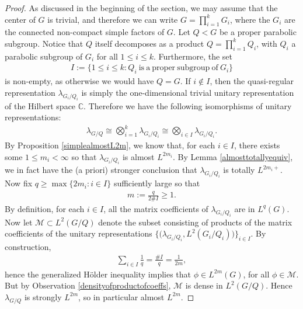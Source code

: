 \documentclass[psamsfonts]{amsart}
\theoremstyle{definition}
\theoremstyle{remark}
\numberwithin{equation}{section}
\begin{document}
\begin{proof}
As discussed in the beginning of the section, we may assume that the center of $G$ is trivial, and therefore we can write $G = \prod_{i=1}^{k} G_{i}$, where the $G_{i}$ are the connected non-compact simple factors of $G$. Let $Q < G$ be a proper parabolic subgroup. Notice that $Q$ itself decomposes as a product $Q = \prod_{i=1}^{k} Q_{i}$, with $Q_{i}$ a parabolic subgroup of $G_{i}$ for all $1 \leq i \leq k$. Furthermore, the set
\begin{align*}
I := \{1 \leq i \leq k : Q_{i} \ \mathrm{is \ a \ proper \ subgroup \ of} \ G_{i} \}
\end{align*} is non-empty, as otherwise we would have $Q = G$. If $i \notin I$, then the quasi-regular representation $\lambda_{G_{i} / Q_{i}}$ is simply the one-dimensional trivial unitary representation of the Hilbert space $\mathbb{C}$. Therefore we have the following isomorphisms of unitary representations:
\begin{align*}
\lambda_{G/Q} \cong \bigotimes_{i=1}^{k} \lambda_{G_{i}/Q_{i}} \cong \bigotimes_{i \in I} \lambda_{G_{i}/Q_{i}}.
\end{align*}
By Proposition \ref{simplealmostL2m}, we know that, for each $i \in I$, there exists some $1 \leq m_{i} < \infty$ so that $\lambda_{G_{i}/Q_{i}}$ is almost $L^{2m_{i}}$. By Lemma \ref{almosttotallyequiv}, we in fact have the (a priori) stronger conclusion that $\lambda_{G_{i}/Q_{i}}$ is totally $L^{2m_{i}+}$. Now fix $q \geq \max \{2m_{i} : i \in I\}$ sufficiently large so that 
\begin{align*}
m := \frac{q}{2 \# I} \geq 1.
\end{align*} By definition, for each $i \in I$, all the matrix coefficients of $\lambda_{G_{i}/Q_{i}}$ are in $L^{q}(G)$. Now let $\mathcal{M} \subset L^{2}(G/Q)$ denote the subset consisting of products of the matrix coefficients of the unitary representations $\big \{ \big(\lambda_{G_{i}/Q_{i}}, L^{2}(G_{i}/Q_{i}) \big)\big \}_{i \in I}$. By construction,
\begin{align*}
\sum_{i \in I} \frac{1}{q} = \frac{\# I}{q} = \frac{1}{2m},
\end{align*} hence the generalized H\"older inequality implies that $\phi \in L^{2m}(G)$, for all $\phi \in \mathcal{M}$. But by Observation \ref{densityofproductofcoeffs}, $\mathcal{M}$ is dense in $L^{2}(G/Q)$. Hence $\lambda_{G/Q}$ is strongly $L^{2m}$, so in particular almost $L^{2m}$.

\end{proof}
\end{document}
